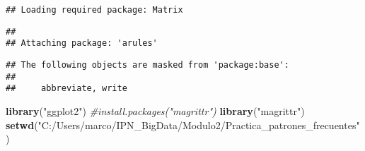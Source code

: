 \documentclass[]{article}
\newenvironment{Shaded}{\begin{snugshade}}{\end{snugshade}}
\newcommand{\KeywordTok}[1]{\textcolor[rgb]{0.13,0.29,0.53}{\textbf{#1}}}
\newcommand{\StringTok}[1]{\textcolor[rgb]{0.31,0.60,0.02}{#1}}
\newcommand{\CommentTok}[1]{\textcolor[rgb]{0.56,0.35,0.01}{\textit{#1}}}
\newcommand{\NormalTok}[1]{#1}
\begin{document}
\begin{verbatim}
## Loading required package: Matrix
\end{verbatim}

\begin{verbatim}
## 
## Attaching package: 'arules'
\end{verbatim}

\begin{verbatim}
## The following objects are masked from 'package:base':
## 
##     abbreviate, write
\end{verbatim}

\begin{Shaded}
\begin{Highlighting}[]
\KeywordTok{library}\NormalTok{(}\StringTok{"ggplot2"}\NormalTok{)}
\CommentTok{#install.packages("magrittr")}
\KeywordTok{library}\NormalTok{(}\StringTok{"magrittr"}\NormalTok{)}
\KeywordTok{setwd}\NormalTok{(}\StringTok{"C:/Users/marco/IPN_BigData/Modulo2/Practica_patrones_frecuentes"}\NormalTok{)}


\end{Highlighting}
\end{Shaded}
\end{document}
